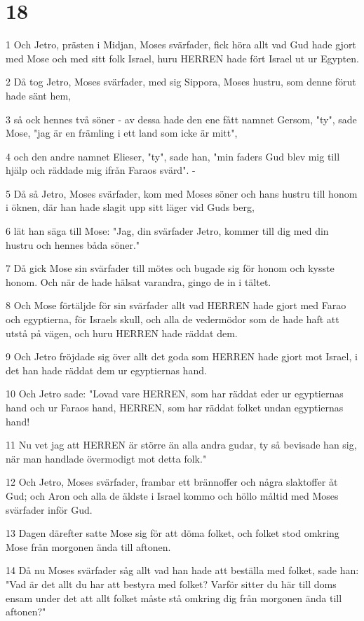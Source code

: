 \chapter{18}

\par 1 Och Jetro, prästen i Midjan, Moses svärfader, fick höra allt vad Gud hade gjort med Mose och med sitt folk Israel, huru HERREN hade fört Israel ut ur Egypten.
\par 2 Då tog Jetro, Moses svärfader, med sig Sippora, Moses hustru, som denne förut hade sänt hem,
\par 3 så ock hennes två söner - av dessa hade den ene fått namnet Gersom, "ty", sade Mose, "jag är en främling i ett land som icke är mitt",
\par 4 och den andre namnet Elieser, "ty", sade han, "min faders Gud blev mig till hjälp och räddade mig ifrån Faraos svärd". -
\par 5 Då så Jetro, Moses svärfader, kom med Moses söner och hans hustru till honom i öknen, där han hade slagit upp sitt läger vid Guds berg,
\par 6 lät han säga till Mose: "Jag, din svärfader Jetro, kommer till dig med din hustru och hennes båda söner."
\par 7 Då gick Mose sin svärfader till mötes och bugade sig för honom och kysste honom. Och när de hade hälsat varandra, gingo de in i tältet.
\par 8 Och Mose förtäljde för sin svärfader allt vad HERREN hade gjort med Farao och egyptierna, för Israels skull, och alla de vedermödor som de hade haft att utstå på vägen, och huru HERREN hade räddat dem.
\par 9 Och Jetro fröjdade sig över allt det goda som HERREN hade gjort mot Israel, i det han hade räddat dem ur egyptiernas hand.
\par 10 Och Jetro sade: "Lovad vare HERREN, som har räddat eder ur egyptiernas hand och ur Faraos hand, HERREN, som har räddat folket undan egyptiernas hand!
\par 11 Nu vet jag att HERREN är större än alla andra gudar, ty så bevisade han sig, när man handlade övermodigt mot detta folk."
\par 12 Och Jetro, Moses svärfader, frambar ett brännoffer och några slaktoffer åt Gud; och Aron och alla de äldste i Israel kommo och höllo måltid med Moses svärfader inför Gud.
\par 13 Dagen därefter satte Mose sig för att döma folket, och folket stod omkring Mose från morgonen ända till aftonen.
\par 14 Då nu Moses svärfader såg allt vad han hade att beställa med folket, sade han: "Vad är det allt du har att bestyra med folket? Varför sitter du här till doms ensam under det att allt folket måste stå omkring dig från morgonen ända till aftonen?"
